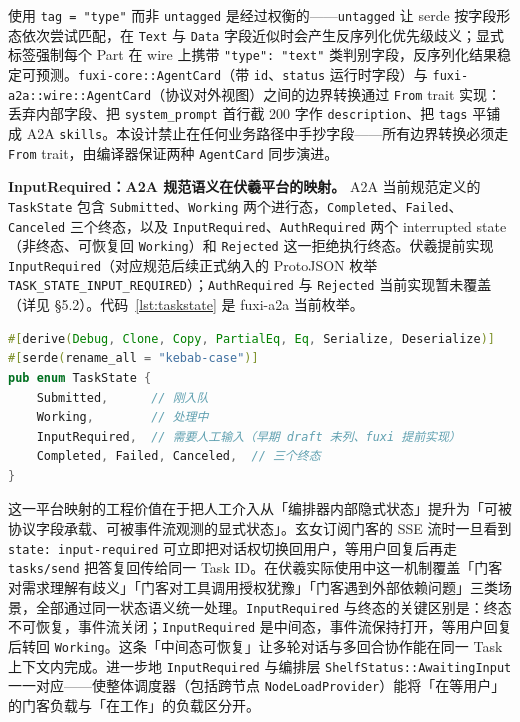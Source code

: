 使用 \texttt{tag = "type"} 而非 \texttt{untagged} 是经过权衡的——\texttt{untagged} 让 serde 按字段形态依次尝试匹配，在 \texttt{Text} 与 \texttt{Data} 字段近似时会产生反序列化优先级歧义；显式标签强制每个 Part 在 wire 上携带 \texttt{"type": "text"} 类判别字段，反序列化结果稳定可预测。\texttt{fuxi-core::AgentCard}（带 \texttt{id}、\texttt{status} 运行时字段）与 \texttt{fuxi-a2a::wire::AgentCard}（协议对外视图）之间的边界转换通过 \texttt{From} trait 实现：丢弃内部字段、把 \texttt{system\_prompt} 首行截 200 字作 \texttt{description}、把 \texttt{tags} 平铺成 A2A \texttt{skills}。本设计禁止在任何业务路径中手抄字段——所有边界转换必须走 \texttt{From} trait，由编译器保证两种 \texttt{AgentCard} 同步演进。

\textbf{InputRequired：A2A 规范语义在伏羲平台的映射。} A2A 当前规范定义的 \texttt{TaskState} 包含 \texttt{Submitted}、\texttt{Working} 两个进行态，\texttt{Completed}、\texttt{Failed}、\texttt{Canceled} 三个终态，以及 \texttt{InputRequired}、\texttt{AuthRequired} 两个 interrupted state（非终态、可恢复回 \texttt{Working}）和 \texttt{Rejected} 这一拒绝执行终态。伏羲提前实现 \texttt{InputRequired}（对应规范后续正式纳入的 ProtoJSON 枚举 \texttt{TASK\_STATE\_INPUT\_REQUIRED}）；\texttt{AuthRequired} 与 \texttt{Rejected} 当前实现暂未覆盖（详见 §5.2）。代码~\ref{lst:taskstate} 是 fuxi-a2a 当前枚举。

\begin{lstlisting}[language=Rust, caption=fuxi-a2a TaskState 枚举（提前实现 InputRequired 中间态）, label=lst:taskstate]
#[derive(Debug, Clone, Copy, PartialEq, Eq, Serialize, Deserialize)]
#[serde(rename_all = "kebab-case")]
pub enum TaskState {
    Submitted,      // 刚入队
    Working,        // 处理中
    InputRequired,  // 需要人工输入（早期 draft 未列、fuxi 提前实现）
    Completed, Failed, Canceled,  // 三个终态
}
\end{lstlisting}

这一平台映射的工程价值在于把人工介入从「编排器内部隐式状态」提升为「可被协议字段承载、可被事件流观测的显式状态」。玄女订阅门客的 SSE 流时一旦看到 \texttt{state: input-required} 可立即把对话权切换回用户，等用户回复后再走 \texttt{tasks/send} 把答复回传给同一 Task ID。在伏羲实际使用中这一机制覆盖「门客对需求理解有歧义」「门客对工具调用授权犹豫」「门客遇到外部依赖问题」三类场景，全部通过同一状态语义统一处理。\texttt{InputRequired} 与终态的关键区别是：终态不可恢复，事件流关闭；\texttt{InputRequired} 是中间态，事件流保持打开，等用户回复后转回 \texttt{Working}。这条「中间态可恢复」让多轮对话与多回合协作能在同一 Task 上下文内完成。进一步地 \texttt{InputRequired} 与编排层 \texttt{ShelfStatus::AwaitingInput} 一一对应——使整体调度器（包括跨节点 \texttt{NodeLoadProvider}）能将「在等用户」的门客负载与「在工作」的负载区分开。

